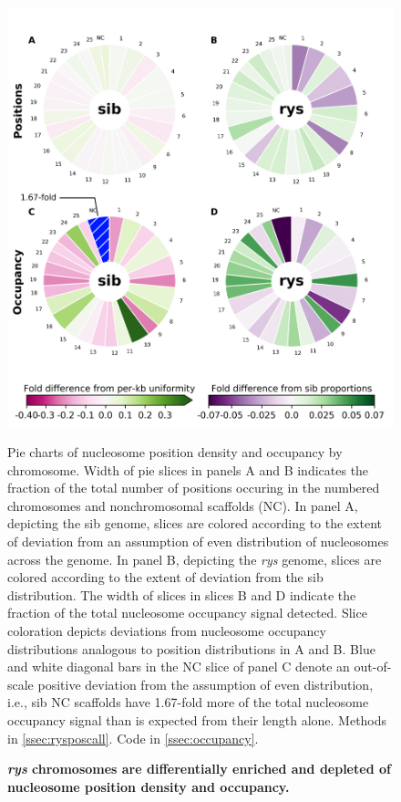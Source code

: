 \documentclass{ut-thesis}
\begin{document}
\begin{NoHyper}
 \begin{figure}[!h]
    \includegraphics{rys/proportional_chromosome_occupancy.png}
    \caption{{\bf \textit{rys} chromosomes are differentially enriched and depleted of nucleosome position density and occupancy.}}
    Pie charts of nucleosome position density and occupancy by chromosome. Width of pie slices in panels A and B indicates the fraction of the total number of positions occuring in the numbered chromosomes and nonchromosomal scaffolds (NC). In panel A, depicting the sib genome, slices are colored according to the extent of deviation from an assumption of even distribution of nucleosomes across the genome. In panel B, depicting the \textit{rys} genome, slices are colored according to the extent of deviation from the sib distribution. The width of slices in slices B and D indicate the fraction of the total nucleosome occupancy signal detected. Slice coloration depicts deviations from nucleosome occupancy distributions analogous to position distributions in A and B. Blue and white diagonal bars in the NC slice of panel C denote an out-of-scale positive deviation from the assumption of even distribution, i.e., sib NC scaffolds have 1.67-fold more of the total nucleosome occupancy signal than is expected from their length alone.
    Methods in \autoref{ssec:rysposcall}.
    Code in \autoref{ssec:occupancy}.
    \label{nucgendist}
    \end{figure}


\end{NoHyper}
\end{document}
